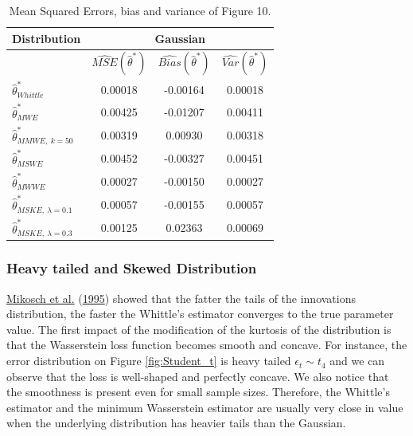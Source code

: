 \documentclass[
  11pt,
]{article}
\begin{document}
\begin{table}[h]
\centering
\begin{tabular}{|l|c|c|c|}
\hline
\textbf{Distribution}                   & \multicolumn{3}{c|}{\textbf{Gaussian}}                                                            \\ \hline
\textbf{}                               & $\widehat{MSE}( \hat \theta^*)$ & $\widehat{Bias}( \hat \theta^*)$ & $\widehat{Var}( \hat \theta^*)$ \\ \hline
$\hat \theta^*_{Whittle}$               & 0.00018                        & -0.00164                         & 0.00018                        \\ \hline
$\hat \theta^*_{MWE}$                   & 0.00425                        & -0.01207                         & 0.00411                        \\ \hline
$\hat \theta^*_{MMWE, \ k = 50}$        & 0.00319                        & 0.00930                         & 0.00318                        \\ \hline
$\hat \theta^*_{MSWE}$                  & 0.00452                        & -0.00327                        & 0.00451                        \\ \hline
$\hat \theta^*_{MWWE}$                  & 0.00027                        & -0.00150                        & 0.00027                        \\ \hline
$\hat \theta^*_{MSKE, \ \lambda = 0.1}$ & 0.00057                        & -0.00155                        & 0.00057                        \\ \hline
$\hat \theta^*_{MSKE, \ \lambda = 0.3}$ & 0.00125                        & 0.02363                         & 0.00069                        \\ \hline
\end{tabular}
\caption{Mean Squared Errors, bias and variance of Figure 10.}
\label{tab:farima_mse_gaussian}
\end{table}

\hypertarget{heavy-tailed-and-skewed-distribution}{%
\subsubsection{Heavy tailed and Skewed
Distribution}\label{heavy-tailed-and-skewed-distribution}}

\protect\hyperlink{ref-mikosch1995parameter}{Mikosch et al.}
(\protect\hyperlink{ref-mikosch1995parameter}{1995}) showed that the
fatter the tails of the innovations distribution, the faster the
Whittle's estimator converges to the true parameter value. The first
impact of the modification of the kurtosis of the distribution is that
the Wasserstein loss function becomes smooth and concave. For instance,
the error distribution on Figure \ref{fig:Student_t} is heavy tailed
\(\epsilon_t \sim t_4\) and we can observe that the loss is well-shaped
and perfectly concave. We also notice that the smoothness is present
even for small sample sizes. Therefore, the Whittle's estimator and the
minimum Wasserstein estimator are usually very close in value when the
underlying distribution has heavier tails than the Gaussian.
\end{document}
